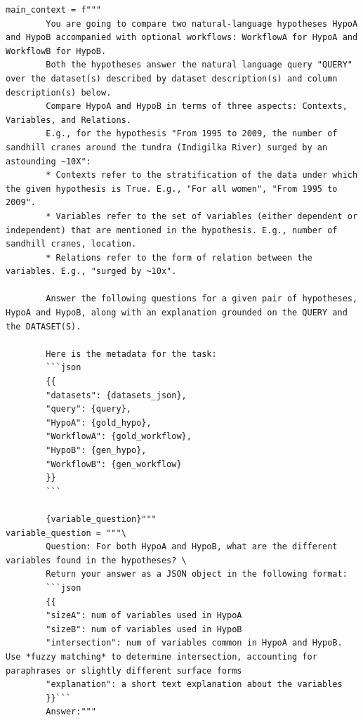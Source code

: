\begin{listing}[!ht]
\begin{verbatim}
main_context = f"""
        You are going to compare two natural-language hypotheses HypoA and HypoB accompanied with optional workflows: WorkflowA for HypoA and WorkflowB for HypoB.
        Both the hypotheses answer the natural language query "QUERY" over the dataset(s) described by dataset description(s) and column description(s) below.
        Compare HypoA and HypoB in terms of three aspects: Contexts, Variables, and Relations.
        E.g., for the hypothesis "From 1995 to 2009, the number of sandhill cranes around the tundra (Indigilka River) surged by an astounding ~10X":
        * Contexts refer to the stratification of the data under which the given hypothesis is True. E.g., "For all women", "From 1995 to 2009". 
        * Variables refer to the set of variables (either dependent or independent) that are mentioned in the hypothesis. E.g., number of sandhill cranes, location.
        * Relations refer to the form of relation between the variables. E.g., "surged by ~10x".

        Answer the following questions for a given pair of hypotheses, HypoA and HypoB, along with an explanation grounded on the QUERY and the DATASET(S).

        Here is the metadata for the task:
        ```json
        {{
        "datasets": {datasets_json},
        "query": {query},
        "HypoA": {gold_hypo},
        "WorkflowA": {gold_workflow},
        "HypoB": {gen_hypo},
        "WorkflowB": {gen_workflow}
        }}
        ```

        {variable_question}"""
variable_question = """\
        Question: For both HypoA and HypoB, what are the different variables found in the hypotheses? \
        Return your answer as a JSON object in the following format:
        ```json
        {{
        "sizeA": num of variables used in HypoA
        "sizeB": num of variables used in HypoB
        "intersection": num of variables common in HypoA and HypoB. Use *fuzzy matching* to determine intersection, accounting for paraphrases or slightly different surface forms
        "explanation": a short text explanation about the variables
        }}```
        Answer:"""
\end{verbatim}
\vspace{-1em}
\caption{Prompt for variable alignment between two sub-hypotheses.}
\label{list:variable}
\end{listing}


